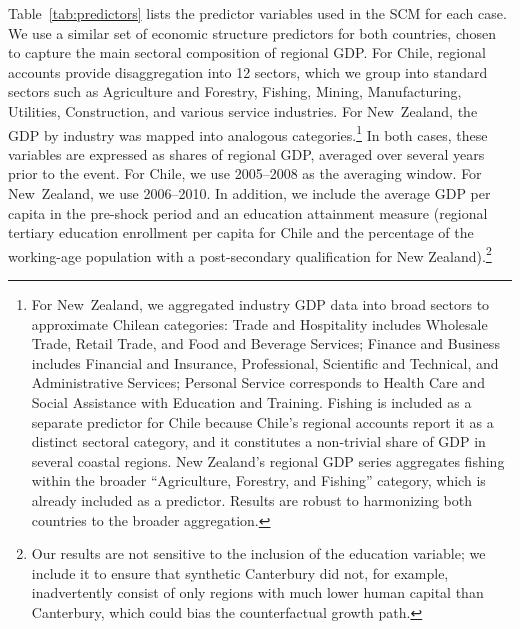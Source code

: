 \documentclass[12pt]{article}
\begin{document}
Table \ref{tab:predictors} lists the predictor variables used in the SCM for each case. We use a similar set of economic structure predictors for both countries, chosen to capture the main sectoral composition of regional GDP. For Chile, regional accounts provide disaggregation into 12 sectors, which we group into standard sectors such as Agriculture and Forestry, Fishing, Mining, Manufacturing, Utilities, Construction, and various service industries. For New Zealand, the GDP by industry was mapped into analogous categories.\footnote{For New Zealand, we aggregated industry GDP data into broad sectors to approximate Chilean categories: Trade and Hospitality includes Wholesale Trade, Retail Trade, and Food and Beverage Services; Finance and Business includes Financial and Insurance, Professional, Scientific and Technical, and Administrative Services; Personal Service corresponds to Health Care and Social Assistance with Education and Training. Fishing is included as a separate predictor for Chile because Chile's regional accounts report it as a distinct sectoral category, and it constitutes a non-trivial share of GDP in several coastal regions. New Zealand's regional GDP series aggregates fishing within the broader ``Agriculture, Forestry, and Fishing'' category, which is already included as a predictor. Results are robust to harmonizing both countries to the broader aggregation.} In both cases, these variables are expressed as shares of regional GDP, averaged over several years prior to the event. For Chile, we use 2005–2008 as the averaging window. For New Zealand, we use 2006–2010. In addition, we include the average GDP per capita in the pre-shock period and an education attainment measure (regional tertiary education enrollment per capita for Chile and the percentage of the working-age population with a post-secondary qualification for New Zealand).\footnote{Our results are not sensitive to the inclusion of the education variable; we include it to ensure that synthetic Canterbury did not, for example, inadvertently consist of only regions with much lower human capital than Canterbury, which could bias the counterfactual growth path.} 
\end{document}
